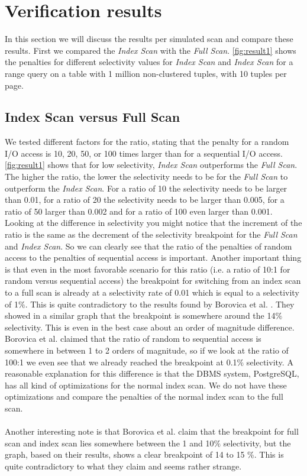 \documentclass[a4paper,11pt,twoside]{article}
\begin{document}
\section{Verification results}
In this section we will discuss the results per simulated scan and compare these results. First we compared the \textit{Index Scan} with the \textit{Full Scan}. \autoref{fig:result1} shows the penalties for different selectivity values for \textit{Index Scan} and \textit{Index Scan} for a range query on a table with 1 million non-clustered tuples, with 10 tuples per page. \\

\subsection{Index Scan versus Full Scan}
We tested different factors for the ratio, stating that the penalty for a random I/O access is 10, 20, 50, or 100 times larger than for a sequential I/O access. \autoref{fig:result1} shows that for low selectivity, \textit{Index Scan} outperforms the \textit{Full Scan}. The higher the ratio, the lower the selectivity needs to be for the \textit{Full Scan} to outperform the \textit{Index Scan}. For a ratio of 10 the selectivity needs to be larger than 0.01, for a ratio of 20 the selectivity needs to be larger than  0.005, for a ratio of 50 larger than 0.002 and for a ratio of 100 even larger than 0.001.\\
Looking at the difference in selectivity you might notice that the increment of the ratio is the same as the decrement of the selectivity breakpoint for the  \textit{Full Scan} and \textit{Index Scan}. So we can clearly see that the ratio of the penalties of random access to the penalties of sequential access is important. Another important thing is that even in the most favorable scenario for this ratio (i.e. a ratio of 10:1 for random versus sequential access) the breakpoint for switching from an index scan to a full scan is already at a selectivity rate of 0.01 which is equal to a selectivity of 1$\%$. This is quite contradictory to the results found by Borovica et al. \cite{smoothscan}. They showed in a similar graph that the breakpoint is somewhere around the 14$\%$ selectivity. This is even in the best case about an order of magnitude difference. Borovica et al. claimed that the ratio of random to sequential access is somewhere in between 1 to 2 orders of magnitude, so if we look at the ratio of 100:1 we even see that we already reached the breakpoint at 0.1$\%$ selectivity. A reasonable explanation for this difference is that the DBMS system, PostgreSQL, has all kind of optimizations for the normal index scan. We do not have these optimizations and compare the penalties of the normal index scan to the full scan. \\
\\
Another interesting note is that Borovica et al. \cite{smoothscan} claim that the breakpoint for full scan and index scan lies somewhere between the 1 and 10$\%$ selectivity, but the graph, based on their results, shows a clear breakpoint of 14 to 15 $\%$. This is quite contradictory to what they claim and seems rather strange.
\end{document}
